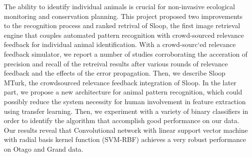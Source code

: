 % 
% 
%



The ability to identify individual animals is crucial for non-invasive ecological monitoring and conservation planning. This project proposed two improvements to the recognition process and ranked retrival of Sloop, the first image retrieval engine that couples automated pattern recognition with crowd-sourced relevance feedback for individual animal identification. 
With a crowd-sourc`ed relevance feedback simulator, we report a number of studies corroborating the acceration of precision and recall of the retreival results after various rounds of relevance feedback and the effects of the error propagation. 
Then, we describe Sloop MTurk, the crowdsourced relevance feedback integration of Sloop.
In the later part, we propose a new architecture for animal pattern recognition, which could possibly reduce the system necessity for human involvement in feature extraction using transfer learning. Then, we experiment with a variety of binary classifiers in order to identify the algorithm that accomplish good performance on our data. Our results reveal that Convolutional network with linear support vector machine with radial basis kernel function (SVM-RBF) achieves a very robust performance on Otago and Grand data.


